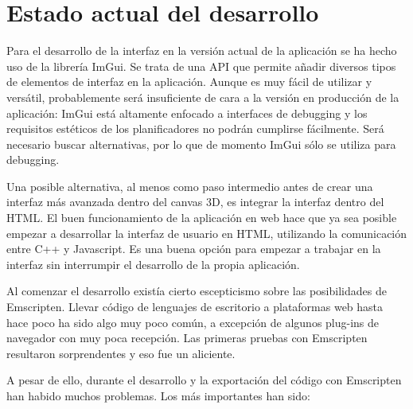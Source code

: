 \section{Estado actual del desarrollo}
Para el desarrollo de la interfaz en la versión actual de la aplicación se ha hecho uso de la librería ImGui. Se trata de una API que permite añadir diversos tipos de elementos de interfaz en la aplicación. Aunque es muy fácil de utilizar y versátil, probablemente será insuficiente de cara a la versión en producción de la aplicación: ImGui está altamente enfocado a interfaces de debugging y los requisitos estéticos de los planificadores no podrán cumplirse fácilmente. Será necesario buscar alternativas, por lo que de momento ImGui sólo se utiliza para debugging.

Una posible alternativa, al menos como paso intermedio antes de crear una interfaz más avanzada dentro del canvas 3D, es integrar la interfaz dentro del HTML. El buen funcionamiento de la aplicación en web hace que ya sea posible empezar a desarrollar la interfaz de usuario en HTML, utilizando la comunicación entre C++ y Javascript. Es una buena opción para empezar a trabajar en la interfaz sin interrumpir el desarrollo de la propia aplicación.

Al comenzar el desarrollo existía cierto escepticismo sobre las posibilidades de Emscripten. Llevar código de lenguajes de escritorio a plataformas web hasta hace poco ha sido algo muy poco común, a excepción de algunos plug-ins de navegador con muy poca recepción. Las primeras pruebas con Emscripten resultaron sorprendentes y eso fue un aliciente.

A pesar de ello, durante el desarrollo y la exportación del código con Emscripten han habido muchos problemas. Los más importantes han sido:

